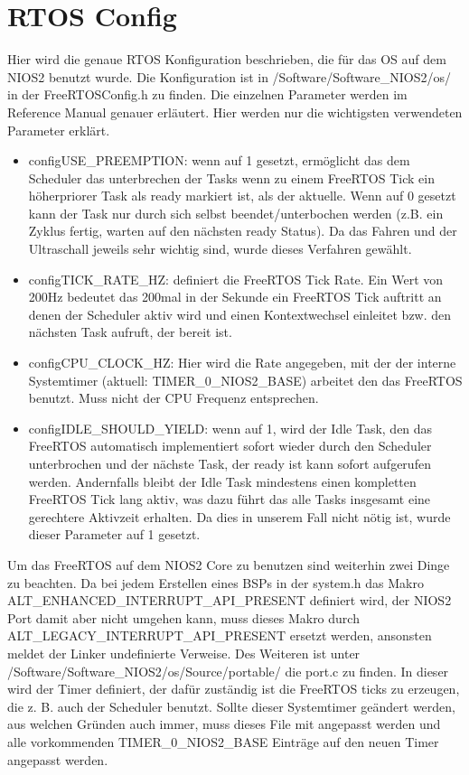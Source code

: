  \section{RTOS Config}
Hier wird die genaue RTOS Konfiguration beschrieben, die für das OS auf dem NIOS2 benutzt wurde. Die Konfiguration ist in /Software/Software\_NIOS2/os/ in der FreeRTOSConfig.h zu finden. Die einzelnen Parameter werden im Reference Manual genauer erläutert. Hier werden nur die wichtigsten verwendeten Parameter erklärt.
\begin{itemize}
 \item configUSE\_PREEMPTION: wenn auf 1 gesetzt, ermöglicht das dem Scheduler das unterbrechen der Tasks wenn zu einem FreeRTOS Tick ein höherpriorer Task als ready markiert ist, als der aktuelle. Wenn auf 0 gesetzt kann der Task nur durch sich selbst beendet/unterbochen werden (z.B. ein Zyklus fertig, warten auf den nächsten ready Status). Da das Fahren und der Ultraschall jeweils sehr wichtig sind, wurde dieses Verfahren gewählt.
 \item configTICK\_RATE\_HZ: definiert die FreeRTOS Tick Rate. Ein Wert von 200Hz bedeutet das 200mal in der Sekunde ein FreeRTOS Tick auftritt an denen der Scheduler aktiv wird und einen Kontextwechsel einleitet bzw. den nächsten Task aufruft, der bereit ist.
 \item configCPU\_CLOCK\_HZ: Hier wird die Rate angegeben, mit der der interne Systemtimer (aktuell: TIMER\_0\_NIOS2\_BASE) arbeitet den das FreeRTOS benutzt. Muss nicht der CPU Frequenz entsprechen.
 \item configIDLE\_SHOULD\_YIELD: wenn auf 1, wird der Idle Task, den das FreeRTOS automatisch implementiert sofort wieder durch den Scheduler unterbrochen und der nächste Task, der ready ist kann sofort aufgerufen werden. Andernfalls bleibt der Idle Task mindestens einen kompletten FreeRTOS Tick lang aktiv, was dazu führt das alle Tasks insgesamt eine gerechtere Aktivzeit erhalten. Da dies in unserem Fall nicht nötig ist, wurde dieser Parameter auf 1 gesetzt.
\end{itemize}
Um das FreeRTOS auf dem NIOS2 Core zu benutzen sind weiterhin zwei Dinge zu beachten. Da bei jedem Erstellen eines BSPs in der system.h das Makro ALT\_ENHANCED\_INTERRUPT\_API\_PRESENT definiert wird, der NIOS2 Port damit aber nicht umgehen kann, muss dieses Makro durch ALT\_LEGACY\_INTERRUPT\_API\_PRESENT ersetzt werden, ansonsten meldet der Linker undefinierte Verweise. Des Weiteren ist unter /Software/Software\_NIOS2/os/Source/portable/ die port.c zu finden. In dieser wird der Timer definiert, der dafür zuständig ist die FreeRTOS ticks zu erzeugen, die z. B. auch der Scheduler benutzt. Sollte dieser Systemtimer geändert werden, aus welchen Gründen auch immer, muss dieses File mit angepasst werden und alle vorkommenden TIMER\_0\_NIOS2\_BASE Einträge auf den neuen Timer angepasst werden.